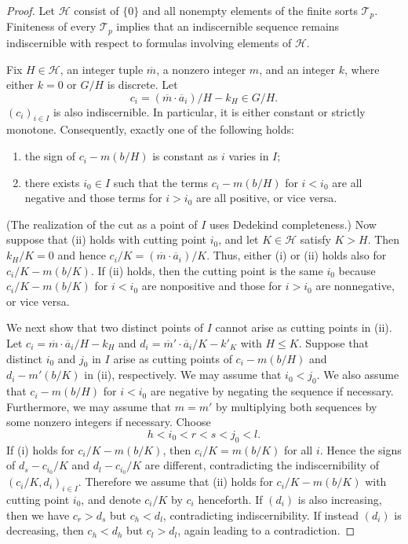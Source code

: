 \documentclass{article}
\theoremstyle{definition}
\theoremstyle{remark}
\theoremstyle{plain}
\begin{document}
\begin{proof}
	Let $\mathcal{H}$ consist of $\{0\}$ and all nonempty elements of the finite sorts $\mathcal{T}_p$.
	Finiteness of every $\mathcal{T}_p$ implies that an indiscernible sequence remains indiscernible with respect to formulas involving elements of $\mathcal{H}$.

	Fix $H\in\mathcal{H}$, an integer tuple $\overline{m}$, a nonzero integer $m$, and an integer $k$, where either $k=0$ or $G/H$ is discrete.
	Let
	\[
		c_i
		=
		(\overline{m}\cdot\overline{a}_i)/H-k_H
		\in
		G/H.
	\]
	$(c_i)_{i\in I}$ is also indiscernible.
	In particular, it is either constant or strictly monotone.
	Consequently, exactly one of the following holds:
	\begin{enumerate}[label=\textup{(\roman*)}]
		\item the sign of $c_i-m(b/H)$ is constant as $i$ varies in $I$;
		\item there exists $i_0\in I$ such that the terms $c_i-m(b/H)$ for $i<i_0$ are all negative and those terms for $i>i_0$ are all positive, or vice versa.
	\end{enumerate}
	(The realization of the cut as a point of $I$ uses Dedekind completeness.)
	Now suppose that (ii) holds with cutting point $i_0$, and let $K\in\mathcal{H}$ satisfy $K>H$.
	Then $k_H / K = 0$ and hence $c_i / K = (\overline{m}\cdot\overline{a}_i)/K$.
	Thus, either (i) or (ii) holds also for $c_i / K - m(b/K)$.
	If (ii) holds, then the cutting point is the same $i_0$ because $c_i / K - m(b/K)$ for $i < i_0$ are nonpositive and those for $i > i_0$ are nonnegative, or vice versa.

	We next show that two distinct points of $I$ cannot arise as cutting points in (ii).
	Let $c_i = \overline{m}\cdot\overline{a}_i/H-k_H$ and $d_i = \overline{m}'\cdot\overline{a}_i/K-k'_K$ with $H \leq K$.
	Suppose that distinct $i_0$ and $j_0$ in $I$ arise as cutting points of $c_i-m(b/H)$ and $d_i-m'(b/K)$ in (ii), respectively.
	We may assume that $i_0 < j_0$.
	We also assume that $c_i-m(b/H)$ for $i < i_0$ are negative by negating the sequence if necessary.
	Furthermore, we may assume that $m = m'$ by multiplying both sequences by some nonzero integers if necessary.
	Choose
	\[
		h<i_0<r<s<j_0<l.
	\]
	If (i) holds for $c_i / K - m(b/K)$, then $c_i / K = m(b/K)$ for all $i$.
	Hence the signs of $d_s - c_{i_0} / K$ and $d_l - c_{i_0} / K$ are different, contradicting the indiscernibility of $(c_i / K, d_i)_{i \in I}$.
	Therefore we assume that (ii) holds for $c_i / K - m(b/K)$ with cutting point $i_0$, and denote $c_i / K$ by $c_i$ henceforth.
	If $(d_i)$ is also increasing, then we have $c_r>d_s$ but $c_h<d_l$, contradicting indiscernibility.
	If instead $(d_i)$ is decreasing, then $c_h<d_h$ but $c_l>d_l$, again leading to a contradiction.


\end{proof}
\end{document}
